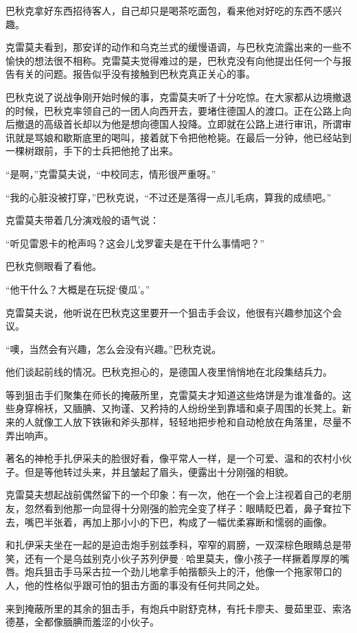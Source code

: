 巴秋克拿好东西招待客人，自己却只是喝茶吃面包，看来他对好吃的东西不感兴趣。

克雷莫夫看到，那安详的动作和乌克兰式的缓慢语调，与巴秋克流露出来的一些不愉快的想法很不相称。克雷莫夫觉得难过的是，巴秋克没有向他提出任何一个与报告有关的问题。报告似乎没有接触到巴秋克真正关心的事。

巴秋克说了说战争刚开始时候的事，克雷莫夫听了十分吃惊。在大家都从边境撤退的时候，巴秋克率领自己的一团人向西开去，要堵住德国人的渡口。正在公路上向后撤退的高级首长却以为他是想向德国人投降。立即就在公路上进行审讯，所谓审讯就是骂娘和歇斯底里的喝叫，接着就下令把他枪毙。在最后一分钟，他已经站到一棵树跟前，手下的士兵把他抢了出来。

“是啊，”克雷莫夫说，“中校同志，情形很严重呀。”

“我的心脏没被打穿，”巴秋克说，“不过还是落得一点儿毛病，算我的成绩吧。”

克雷莫夫带着几分演戏般的语气说：

“听见雷恩卡的枪声吗？这会儿戈罗霍夫是在干什么事情吧？”

巴秋克侧眼看了看他。

“他干什么？大概是在玩捉‘傻瓜’。”

克雷莫夫说，他听说在巴秋克这里要开一个狙击手会议，他很有兴趣参加这个会议。

“噢，当然会有兴趣，怎么会没有兴趣。”巴秋克说。

他们谈起前线的情况。巴秋克担心的，是德国人夜里悄悄地在北段集结兵力。

等到狙击手们聚集在师长的掩蔽所里，克雷莫夫才知道这些烙饼是为谁准备的。这些身穿棉袄，又腼腆、又拘谨、又矜持的人纷纷坐到靠墙和桌子周围的长凳上。新来的人就像工人放下铁锹和斧头那样，轻轻地把步枪和自动枪放在角落里，尽量不弄出响声。

著名的神枪手扎伊采夫的脸很好看，像平常人一样，是一个可爱、温和的农村小伙子。但是等他转过头来，并且皱起了眉头，便露出十分刚强的相貌。

克雷莫夫想起战前偶然留下的一个印象：有一次，他在一个会上注视着自己的老朋友，忽然看到他那一向显得十分刚强的脸完全变了样子：眼睛眨巴着，鼻子耷拉下去，嘴巴半张着，再加上那小小的下巴，构成了一幅优柔寡断和懦弱的画像。

和扎伊采夫坐在一起的是迫击炮手别兹季科，窄窄的肩膀，一双深棕色眼睛总是带笑，还有一个是乌兹别克小伙子苏列伊曼·哈里莫夫，像小孩子一样撅着厚厚的嘴唇。炮兵狙击手马采古拉一个劲儿地拿手帕揩额头上的汗，他像一个拖家带口的人，他的性格似乎跟可怕的狙击方面的事没有任何共同之处。

来到掩蔽所里的其余的狙击手，有炮兵中尉舒克林，有托卡廖夫、曼茹里亚、索洛德基，全都像腼腆而羞涩的小伙子。

